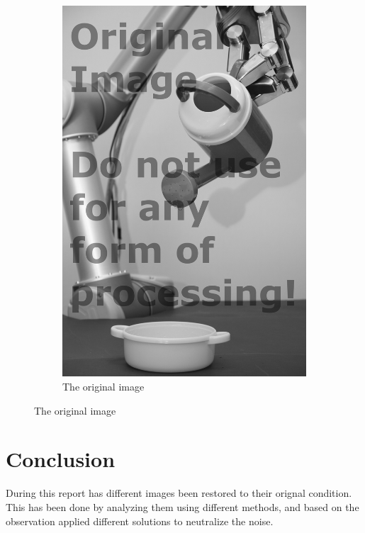 \begin{figure}[H]
\begin{subfigure}[b]{0.24\textwidth}
        \includegraphics[width=\textwidth]{org.png}
        \caption{The original image}
        \label{fig:img2_src}
    \end{subfigure}
\end{figure}

\section{Conclusion}
During this report has different images been restored to their orignal condition. This has been done by analyzing them using different methods, and based on the observation applied different solutions to neutralize the noise.  

